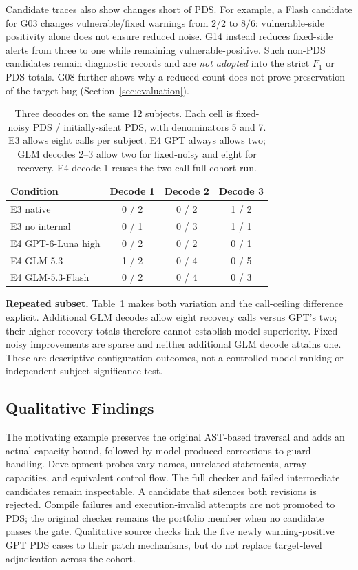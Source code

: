 Candidate traces also show changes short of PDS. For example, a Flash candidate for G03 changes vulnerable/fixed warnings from $2/2$ to $8/6$: vulnerable-side positivity alone does not ensure reduced noise. G14 instead reduces fixed-side alerts from three to one while remaining vulnerable-positive. Such non-PDS candidates remain diagnostic records and are \emph{not adopted} into the strict $F_1$ or PDS totals. G08 further shows why a reduced count does not prove preservation of the target bug (Section~\ref{sec:evaluation}).

\begin{table}[t]
\centering\footnotesize
\setlength{\tabcolsep}{5pt}
\caption{Three decodes on the same 12 subjects. Each cell is fixed-noisy PDS / initially-silent PDS, with denominators 5 and 7. E3 allows eight calls per subject. E4 GPT always allows two; GLM decodes 2--3 allow two for fixed-noisy and eight for recovery. E4 decode 1 reuses the two-call full-cohort run.}
\label{tab:repeats}
\begin{tabular}{@{}lccc@{}}
\toprule
Condition & Decode 1 & Decode 2 & Decode 3 \\
\midrule
E3 native & 0 / 2 & 0 / 2 & 1 / 2 \\
E3 no internal & 0 / 1 & 0 / 3 & 1 / 1 \\
E4 GPT-6-Luna high & 0 / 2 & 0 / 2 & 0 / 1 \\
E4 GLM-5.3 & 1 / 2 & 0 / 4 & 0 / 5 \\
E4 GLM-5.3-Flash & 0 / 2 & 0 / 4 & 0 / 3 \\
\bottomrule
\end{tabular}
\end{table}

\textbf{Repeated subset.} Table~\ref{tab:repeats} makes both variation and the call-ceiling difference explicit. Additional GLM decodes allow eight recovery calls versus GPT's two; their higher recovery totals therefore cannot establish model superiority. Fixed-noisy improvements are sparse and neither additional GLM decode attains one. These are descriptive configuration outcomes, not a controlled model ranking or independent-subject significance test.

\subsection{Qualitative Findings}

The motivating example preserves the original AST-based traversal and adds an actual-capacity bound, followed by model-produced corrections to guard handling. Development probes vary names, unrelated statements, array capacities, and equivalent control flow. The full checker and failed intermediate candidates remain inspectable. A candidate that silences both revisions is rejected. Compile failures and execution-invalid attempts are not promoted to PDS; the original checker remains the portfolio member when no candidate passes the gate. Qualitative source checks link the five newly warning-positive GPT PDS cases to their patch mechanisms, but do not replace target-level adjudication across the cohort.
